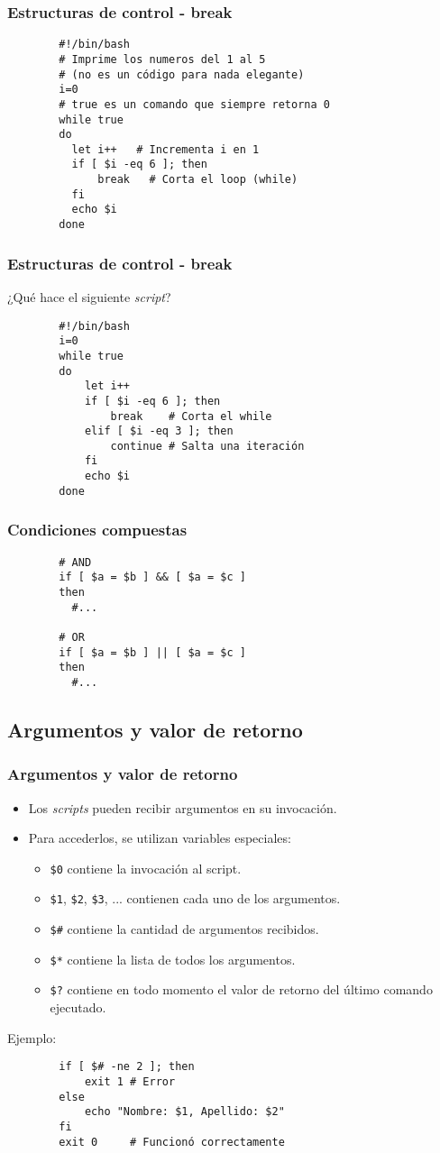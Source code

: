 \begin{frame}[fragile]
	\frametitle{Estructuras de control - break}
	\begin{lstlisting}
		#!/bin/bash
		# Imprime los numeros del 1 al 5
		# (no es un código para nada elegante)‏
		i=0
		# true es un comando que siempre retorna 0
		while true
		do
		  let i++   # Incrementa i en 1
		  if [ $i -eq 6 ]; then
		      break   # Corta el loop (while)‏
		  fi
		  echo $i
		done
	\end{lstlisting}
\end{frame}
\begin{frame}[fragile]
	\frametitle{Estructuras de control - break}
	\begin{center}
		{\Large ¿Qué hace el siguiente \textit{script}?}
	\end{center}

	\begin{lstlisting}
		#!/bin/bash
		i=0 
		while true
		do
		    let i++
		    if [ $i -eq 6 ]; then
		        break    # Corta el while
		    elif [ $i -eq 3 ]; then
		        continue # Salta una iteración
		    fi
		    echo $i  
		done
	\end{lstlisting}
\end{frame}
\begin{frame}[fragile]
	\frametitle{Condiciones compuestas}
	\begin{lstlisting}
		# AND
		if [ $a = $b ] && [ $a = $c ]
		then
		  #...
		 
		# OR
		if [ $a = $b ] || [ $a = $c ]
		then
		  #...
	\end{lstlisting}
\end{frame}
\subsection{Argumentos y valor de retorno}
\begin{frame}[fragile]
	\frametitle{Argumentos y valor de retorno}
	\begin{itemize}
		\item Los \textit{scripts} pueden recibir argumentos en su invocación.
		\item Para accederlos, se utilizan variables especiales:
		\begin{itemize}
			\item \texttt{\$0} contiene la invocación al script.
			\item \texttt{\$1}, \texttt{\$2}, \texttt{\$3}, ... contienen cada uno de los argumentos.
			\item \texttt{\$\#} contiene la cantidad de argumentos recibidos.
			\item \texttt{\$*} contiene la lista de todos los argumentos.
			\item \texttt{\$?} contiene en todo momento el valor de retorno del último comando ejecutado.
		\end{itemize}
	\end{itemize}
	Ejemplo:
	\begin{lstlisting}
		if [ $# -ne 2 ]; then
		    exit 1 # Error
		else
		    echo "Nombre: $1, Apellido: $2"
		fi
		exit 0     # Funcionó correctamente
	\end{lstlisting}
\end{frame}

